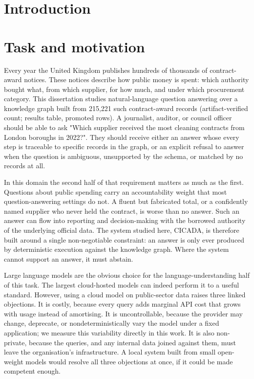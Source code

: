 \documentclass[10pt]{article} %
\begin{document}
\section{Introduction}\label{sec:chapter-1-introduction}

\section{Task and motivation}\label{sec:task-and-motivation}

Every year the United Kingdom publishes hundreds of thousands of contract-award notices. These notices describe how public money is spent: which authority bought what, from which supplier, for how much, and under which procurement category. This dissertation studies natural-language question answering over a knowledge graph built from 215,221 such contract-award records (artifact-verified count; results table, promoted rows). A journalist, auditor, or council officer should be able to ask "Which supplier received the most cleaning contracts from London boroughs in 2022?". They should receive either an answer whose every step is traceable to specific records in the graph, or an explicit refusal to answer when the question is ambiguous, unsupported by the schema, or matched by no records at all.

In this domain the second half of that requirement matters as much as the first. Questions about public spending carry an accountability weight that most question-answering settings do not. A fluent but fabricated total, or a confidently named supplier who never held the contract, is worse than no answer. Such an answer can flow into reporting and decision-making with the borrowed authority of the underlying official data. The system studied here, CICADA, is therefore built around a single non-negotiable constraint: an answer is only ever produced by deterministic execution against the knowledge graph. Where the system cannot support an answer, it must abstain.

Large language models are the obvious choice for the language-understanding half of this task. The largest cloud-hosted models can indeed perform it to a useful standard. However, using a cloud model on public-sector data raises three linked objections. It is costly, because every query adds marginal API cost that grows with usage instead of amortising. It is uncontrollable, because the provider may change, deprecate, or nondeterministically vary the model under a fixed application; we measure this variability directly in this work. It is also non-private, because the queries, and any internal data joined against them, must leave the organisation's infrastructure. A local system built from small open-weight models would resolve all three objections at once, if it could be made competent enough.
\end{document}
